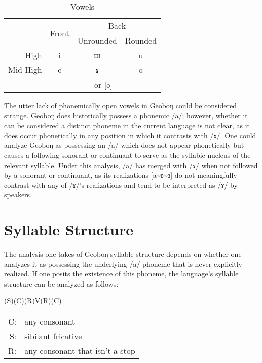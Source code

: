 \documentclass[a4paper,11pt,oneside,openany]{memoir}
\newcommand{\nm}{\symbol{"2205}}
\newcommand{\til}{\textasciitilde}
\newcommand{\bripa}[1]{[#1]}
\newcommand{\phipa}[1]{/#1/}
\newcommand{\engma}{ŋ}
\newcommand{\unru}{ɯ}
\newcommand{\unro}{ɤ}
\newcommand{\schwa}{ə}
\newcommand{\centruh}{ɜ}
\newcommand{\centra}{ɐ}
\begin{document}
\begin{table}[h]
    \centering
\begin{tabular}{@{}rccc@{}}
\toprule
 & \multicolumn{1}{c}{\multirow{2}{*}{Front}} & \multicolumn{2}{c}{Back} \\
 & \multicolumn{1}{c}{} & \multicolumn{1}{c}{Unrounded} & \multicolumn{1}{c}{Rounded} \\ \midrule
High & i & \unru & u \\
Mid-High & e & \unro & o \\ 
 & \multicolumn{3}{c}{\nm{} or \bripa{\schwa}} \\ \bottomrule
\end{tabular}
    \caption{Vowels}
    \label{tab:vowels}
\end{table}

The utter lack of phonemically open vowels in Geobo{\engma} could be considered strange. Geobo{\engma} does historically possess a phonemic \phipa{a}; however, whether it can be considered a distinct phoneme in the current language is not clear, as it does occur phonetically in any position in which it contrasts with \phipa{\unro}. One could analyze Geobo{\engma} as possessing an \phipa{a} which does not appear phonetically but causes a following sonorant or continuant to serve as the syllabic nucleus of the relevant syllable. Under this analysis, \phipa{a} has merged with \phipa{\unro} when not followed by a sonorant or continuant, as its realizations \bripa{a\til\centra\til\centruh} do not meaningfully contrast with any of \phipa{\unro}'s realizations and tend to be interpreted as \phipa{\unro} by speakers.

\section{Syllable Structure}

The analysis one takes of Geobo{\engma} syllable structure depends on whether one analyzes it as possessing the underlying \phipa{a} phoneme that is never explicitly realized. If one posits the existence of this phoneme, the language's syllable structure can be analyzed as follows:

\begin{center}
    (S)(C)(R)V(R)(C)
    
    \begin{tabular}{rl}
         C: & any consonant \\
         S: & sibilant fricative  \\
         R: & any consonant that isn't a stop
    \end{tabular}
\end{center}
\end{document}
